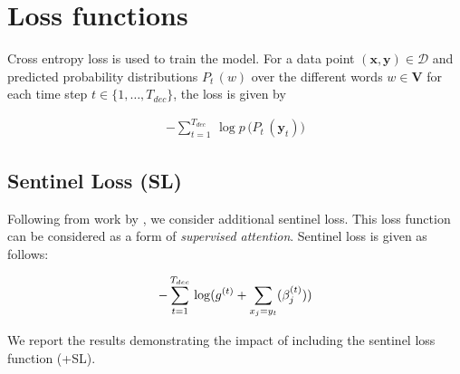 \section{Loss functions} \label{sec:Method4}

Cross entropy loss is used to train the model.
For a data point $( \mathbf{x}, \mathbf{y} ) \in \mathcal{D}$ and predicted probability distributions $P_t\,(w)$ over the different words $w \in \mathbf{V}$ for each time step $t \in \{1,\ldots,T_{dec}\}$, the loss is given by
\begin{center}
\small
\begin{align*}
  - \sum_{t=1}^{T_{dec}} \,\log p\,\bigl(P_t\,(\mathbf{y}_t) \bigr)
\end{align*}
\normalsize
\end{center}

\subsection{Sentinel Loss (\textsc{SL})}
Following from work by \cite{merity2016pointer}, we consider additional sentinel loss. This loss function can be considered as a form of \emph{supervised attention}. Sentinel loss is given as follows:
\begin{center}
\small
\begin{align*}
  - \sum_{t=1}^{T_{dec}} \,\log ( g^{(t)} + \sum_{x_j=y_t}( \beta^{(t)}_j ) )
\normalsize
\end{align*}
\end{center}


We report the results demonstrating the impact of including the sentinel loss function (\textsc{+SL}).


